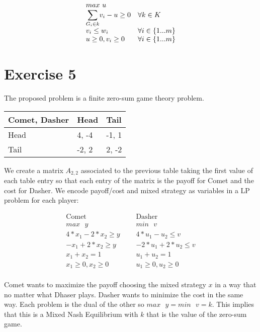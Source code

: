 \documentclass[paper=a4, fontsize=11pt]{scrartcl} %
\numberwithin{equation}{section} %
\numberwithin{figure}{section} %
\numberwithin{table}{section} %
\begin{document}
\[
    \begin{array}{ll}
    max\text{ }u & \\
    \mathlarger{\sum}_{G_i \in k} v_i - u \geq 0 & \forall k \in K \\
    v_i \leq w_i & \forall i \in \{1 ... m\}\\
    u \geq 0, v_i \geq 0 & \forall i \in \{1 ... m\}
    \end{array}
\]

\newpage
\section{Exercise 5}

The proposed problem is a finite zero-sum game theory problem.

\begin{center}
    \begin{tabular}{ | l | l | l | }
        \hline
        Comet, Dasher & Head & Tail \\ \hline
        Head & 4, -4 & -1, 1 \\ \hline
        Tail & -2, 2 & 2, -2 \\ \hline
    \end{tabular}
\end{center}

We create a matrix $A_{2,2}$ associated to the previous table taking the first value of each table entry so that each entry of the matrix is the payoff for Comet and the cost for Dasher.
We encode payoff/cost and mixed strategy as variables in a LP problem for each player:

\[
    \begin{array}{lll}
    \text{Comet} & \text{  } & \text{Dasher} \\
    max\text{ }y                & & min\text{ }v \\
    4*x_1 - 2*x_2 \geq y    & & 4*u_1 - u_2 \leq v \\
    -x_1 + 2*x_2 \geq y     & & -2*u_1 + 2*u_2 \leq v \\
    x_1 + x_2 = 1               & & u_1 + u_2 = 1 \\
    x_1 \geq 0, x_2 \geq 0      & & u_1 \geq 0, u_2 \geq 0 \\
    \end{array}
\]

Comet wants to maximize the payoff choosing the mixed strategy $x$ in a way that no matter what Dhaser plays. Dasher wants to minimize the cost in the same way.
Each problem is the dual of the other so $max\text{ }y = min\text{ }v = k$. This implies that this is a Mixed Nash Equilibrium with $k$ that is the value of the zero-sum game.
\end{document}
